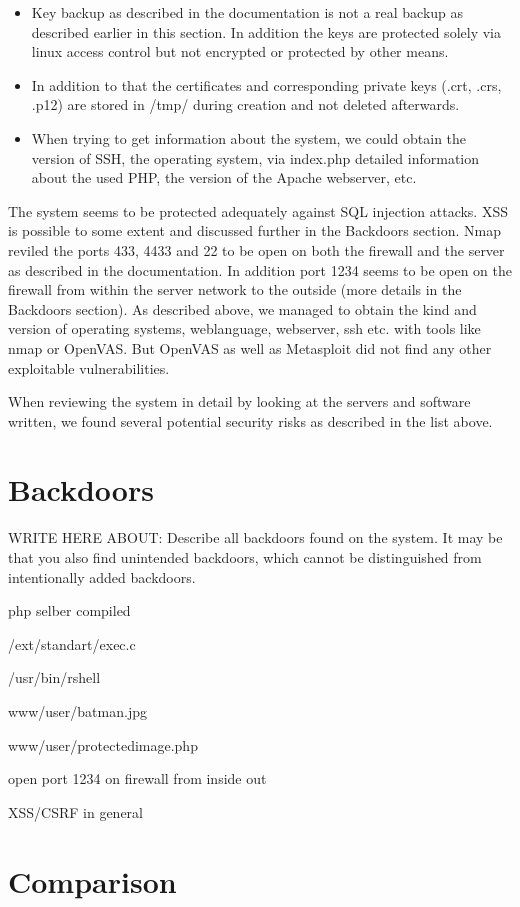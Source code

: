 \documentclass{article}
\begin{document}
\begin{itemize}
\item Key backup as described in the documentation is not a real backup as described earlier in this section. In addition the keys are protected solely via linux access control but not encrypted or protected by other means.
\item In addition to that the certificates and corresponding private keys (.crt, .crs, .p12) are stored in /tmp/ during creation and not deleted afterwards. 
\item When trying to get information about the system, we could obtain the version of SSH, the operating system, via index.php detailed information about the used PHP, the version of the Apache webserver, etc.
\end{itemize}


The system seems to be protected adequately against SQL injection attacks. XSS is possible to some extent and discussed further in the Backdoors section. Nmap reviled the ports 433, 4433 and 22 to be open on both the firewall and the server as described in the documentation. In addition port 1234 seems to be open on the firewall from within the server network to the outside (more details in the Backdoors section). As described above, we managed to obtain the kind and version of operating systems, weblanguage, webserver, ssh etc. with tools like nmap or OpenVAS. But OpenVAS as well as Metasploit did not find any other exploitable vulnerabilities.

When reviewing the system in detail by looking at the servers and software written, we found several potential security risks as described in the list above.
\section{Backdoors}

WRITE HERE ABOUT: 
Describe all backdoors found on the system. 
It may be that you also find unintended backdoors, which cannot be distinguished from intentionally added backdoors.


php selber compiled


/ext/standart/exec.c


/usr/bin/rshell


www/user/batman.jpg


www/user/protectedimage.php


open port 1234 on firewall from inside out


XSS/CSRF in general


\section{Comparison}
\end{document}
